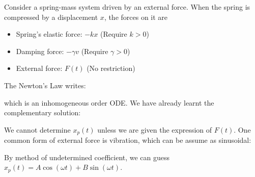 \documentclass[class=article, crop=false, 12pt]{standalone}
\begin{document}
Consider a spring-mass system driven by an external force.
When the spring is compressed by a displacement $x$, the forces on it are
\begin{itemize}
    \item Spring's elastic force: $-kx$ (Require $k>0$)
    \item Damping force: $-\gamma v$ (Require $\gamma >0$)
    \item External force: $F(t)$ (No restriction)
\end{itemize}


The Newton's  Law writes:

which is an inhomogeneous  order ODE. 
We have already learnt the complementary solution:

We cannot determine $x_p(t)$ unless we are given the expression of $F(t)$.
One common form of external force is vibration, 
which can be assume as sinusoidal:

By method of undetermined coefficient, 
we can guess $x_p(t) = A\cos{(\omega t)} + B\sin{(\omega t)}$.
\end{document}
